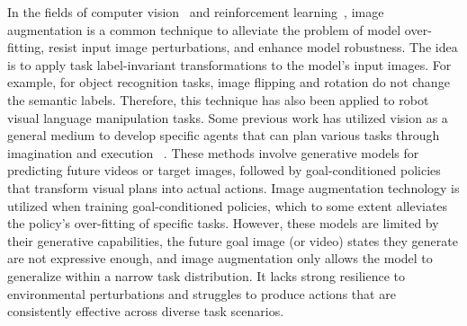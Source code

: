 In the fields of computer vision~\citep{simard2003best,cirecsan2011high,ciregan2012multi,chen2020simple} and reinforcement learning~\citep{laskin2020reinforcement,hansen2021stabilizing,zheng2023stabilizing}, image augmentation is a common technique to alleviate the problem of model over-fitting, resist input image perturbations, and enhance model robustness. 
The idea is to apply task label-invariant transformations to the model's input images. 
For example, for object recognition tasks, image flipping and rotation do not change the semantic labels. 
Therefore, this technique has also been applied to robot visual language manipulation tasks. 
Some previous work has utilized vision as a general medium to develop specific agents that can plan various tasks through imagination and execution ~\citep{black2023zero,Yang2023LearningIR,du2024learning}. 
These methods involve generative models for predicting future videos or target images, followed by goal-conditioned policies that transform visual plans into actual actions. 
Image augmentation technology is utilized when training goal-conditioned policies, which to some extent alleviates the policy's over-fitting of specific tasks. 
However, these models are limited by their generative capabilities, the future goal image (or video) states they generate are not expressive enough, and image augmentation only allows the model to generalize within a narrow task distribution.
It lacks strong resilience to environmental perturbations and struggles to produce actions that are consistently effective across diverse task scenarios.

